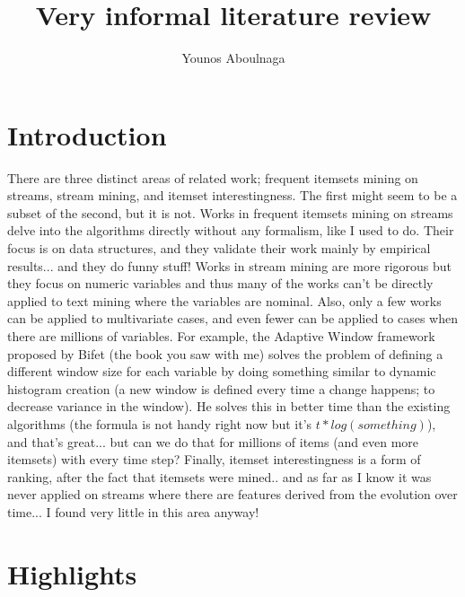 \documentclass[11pt]{llncs} %
\title{Very informal literature review}
\author{Younos Aboulnaga\inst{1}}
\institute{David R. Cheriton School of Computer Science, University of Waterloo, Waterloo, ON, Canada \email{yaboulna@uwaterloo.ca}}
\begin{document}
\maketitle
\section{Introduction}
There are three distinct areas of related work; frequent itemsets mining on streams, stream mining, and itemset interestingness. The first might seem to be a subset of the second, but it is not. Works in frequent itemsets mining on streams delve into the algorithms directly without any formalism, like I used to do. Their focus is on data structures, and they validate their work mainly by empirical results... and they do funny stuff! Works in stream mining are more rigorous but they focus on numeric variables and thus many of the works can't be directly applied to text mining where the variables are nominal. Also, only a few works can be applied to multivariate cases, and even fewer can be applied to cases when there are millions of variables. For example, the Adaptive Window framework proposed by Bifet (the book you saw with me) solves the problem of defining a different window size for each variable by doing something similar to dynamic histogram creation (a new window is defined every time a change happens; to decrease variance in the window). He solves this in better time than the existing algorithms (the formula is not handy right now but it's $t * log(something)$), and that's great... but can we do that for millions of items (and even more itemsets) with every time step? Finally, itemset interestingness is a form of ranking, after the fact that itemsets were mined.. and as far as I know it was never applied on streams where there are features derived from the evolution over time... I found very little in this area anyway!

\section{Highlights}
\end{document}
